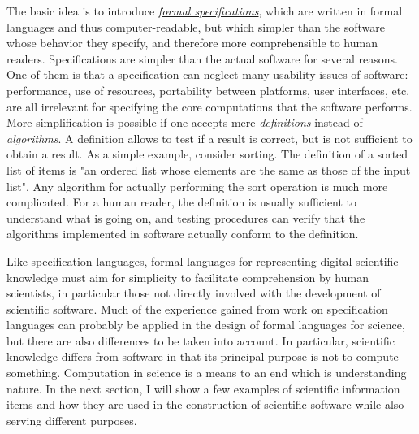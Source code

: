 The basic idea is to introduce \href{https://en.wikipedia.org/wiki/Formal_specification}{\textit{formal specifications}}, which are written in formal languages and thus computer-readable, but which simpler than the software whose behavior they specify, and therefore more comprehensible to human readers. Specifications are simpler than the actual software for several reasons. One of them is that a specification can neglect many usability issues of software: performance, use of resources, portability between platforms, user interfaces, etc. are all irrelevant for specifying the core computations that the software performs. More simplification is possible if one accepts mere \textit{definitions} instead of \textit{algorithms}. A definition allows to test if a result is correct, but is not sufficient to obtain a result. As a simple example, consider sorting. The definition of a sorted list of items is "an ordered list whose elements are the same as those of the input list". Any algorithm for actually performing the sort operation is much more complicated. For a human reader, the definition is usually sufficient to understand what is going on, and testing procedures can verify that the algorithms implemented in software actually conform to the definition.

Like specification languages, formal languages for representing digital scientific knowledge must aim for simplicity to facilitate comprehension by human scientists, in particular those not directly involved with the development of scientific software. Much of the experience gained from work on specification languages can probably be applied in the design of formal languages for science, but there are also differences to be taken into account. In particular, scientific knowledge differs from software in that its principal purpose is not to compute something. Computation in science is a means to an end which is understanding nature. In the next section, I will show a few examples of scientific information items and how they are used in the construction of scientific software while also serving different purposes.
